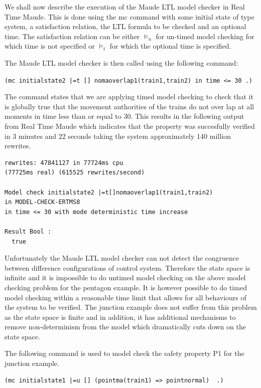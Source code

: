 We shall now describe the execution of the Maude LTL model checker in Real Time Maude. This is done using the mc command with some initial state of type system, a satisfaction relation, the LTL formula to be checked and an optional time. The satisfaction relation can be either $\models_u$ for un-timed model checking for which time is not specified or $\models_t$ for which the optional time is specified.

The Maude LTL model checker is then called using the following command:

\begin{center}
\texttt{(mc initialstate2 |=t [] nomaoverlap1(train1,train2) in time <= 30 .)}
\end{center}
The command states that we are applying timed model checking to check that it is globally true that the movement authorities of the trains do not over lap at all moments in time less than or equal to 30. This results in the following output from Real Time Maude which indicates that the property was succesfully verified in 3 minutes and 22 seconds taking the system approximately 140 million rewrites.
\begin{lstlisting}[caption = No overlapping movement authorities model checking result]
rewrites: 47841127 in 77724ms cpu 
(77725ms real) (615525 rewrites/second)

Model check initialstate2 |=t[]nomaoverlap1(train1,train2)
in MODEL-CHECK-ERTMS8
in time <= 30 with mode deterministic time increase

Result Bool :
  true
\end{lstlisting}

Unfortunately the Maude LTL model checker can not detect the congruence between difference configurations of control system. Therefore the state space is infinite and it is impossible to do untimed model checking on the above model checking problem for the pentagon example. It is however possible to do timed model checking within a reasonable time limit that allows for all behaviours of the system to be verified. The junction example does not suffer from this problem as the state space is finite and in addition, it has additional mechanisms to remove non-determinism from the model which dramatically cuts down on the state space.

The following command is used to model check the safety property P1 for the junction example.

\begin{lstlisting}
(mc initialstate1 |=u [] (pointma(train1) => pointnormal)  .)
\end{lstlisting}

